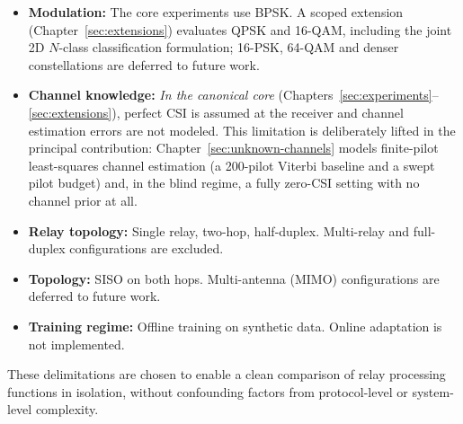 \begin{itemize}
\tightlist
\item
  \textbf{Modulation:} The core experiments use BPSK. A scoped extension (Chapter~\ref{sec:extensions}) evaluates QPSK and 16-QAM, including the joint 2D $N$-class classification formulation; 16-PSK, 64-QAM and denser constellations are deferred to future work.
\item
  \textbf{Channel knowledge:} \emph{In the canonical core} (Chapters~\ref{sec:experiments}--\ref{sec:extensions}), perfect CSI is assumed at the receiver and channel estimation errors are not modeled. This limitation is deliberately lifted in the principal contribution: Chapter~\ref{sec:unknown-channels} models finite-pilot least-squares channel estimation (a 200-pilot Viterbi baseline and a swept pilot budget) and, in the blind regime, a fully zero-CSI setting with no channel prior at all.
\item
  \textbf{Relay topology:} Single relay, two-hop, half-duplex. Multi-relay and full-duplex configurations are excluded.
\item
  \textbf{Topology:} SISO on both hops. Multi-antenna (MIMO) configurations are deferred to future work.
\item
  \textbf{Training regime:} Offline training on synthetic data. Online adaptation is not implemented.
\end{itemize}

These delimitations are chosen to enable a clean comparison of relay processing functions in isolation, without confounding factors from protocol-level or system-level complexity.

